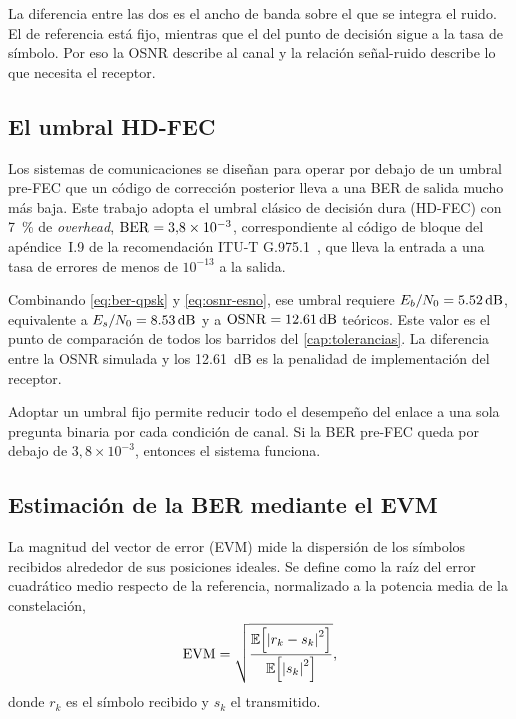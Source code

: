 La diferencia entre las dos es el ancho de banda sobre el que se integra el
ruido. El de referencia est\'a fijo, mientras que el del punto de decisi\'on sigue a la
tasa de s\'imbolo. Por eso la OSNR describe al canal y la relaci\'on
se\~nal-ruido describe lo que necesita el receptor.

\subsection{El umbral HD-FEC}
\label{sec:coh-fec}

Los sistemas de comunicaciones se dise\~nan para operar por debajo de un umbral
pre-FEC que un c\'odigo de correcci\'on posterior lleva a una BER de salida
mucho m\'as baja. Este trabajo adopta el umbral cl\'asico de decisi\'on dura
(HD-FEC) con \SI{7}{\percent} de \emph{overhead},
$\mathrm{BER} = 3{,}8\times10^{-3}$, correspondiente al c\'odigo de bloque del
ap\'endice~I.9 de la recomendaci\'on ITU-T G.975.1~\cite{itu_g975}, que lleva
la entrada a una tasa de errores de menos de $10^{-13}$ a la salida.

Combinando \eqref{eq:ber-qpsk} y \eqref{eq:osnr-esno}, ese umbral requiere
$\EbNo = \SI{5.52}{\dB}$, equivalente a $\EsNo = \SI{8.53}{\dB}$ y a
$\OSNR = \SI{12.61}{\dB}$ te\'oricos. Este valor es el punto de comparaci\'on
de todos los barridos del \cref{cap:tolerancias}. La diferencia entre la OSNR
simulada y los \SI{12.61}{\dB} es la penalidad de implementaci\'on del
receptor.

Adoptar un umbral fijo permite reducir todo el desempe\~no del enlace a una
sola pregunta binaria por cada condici\'on de canal. Si la BER pre-FEC queda
por debajo de $3{,}8\times10^{-3}$, entonces el sistema funciona.

\subsection{Estimaci\'on de la BER mediante el EVM}
\label{sec:coh-evm}

La magnitud del vector de error (EVM) mide la dispersi\'on de los s\'imbolos
recibidos alrededor de sus posiciones ideales. Se define como la ra\'iz del
error cuadr\'atico medio respecto de la referencia, normalizado a la potencia
media de la constelaci\'on,
\begin{equation}
  \mathrm{EVM} = \sqrt{\frac{\mathbb{E}\!\left[\left\lvert r_k - s_k \right\rvert^2\right]}{\mathbb{E}\!\left[\left\lvert s_k \right\rvert^2\right]}},
  \label{eq:evm}
\end{equation}
donde $r_k$ es el s\'imbolo recibido y $s_k$ el transmitido.

